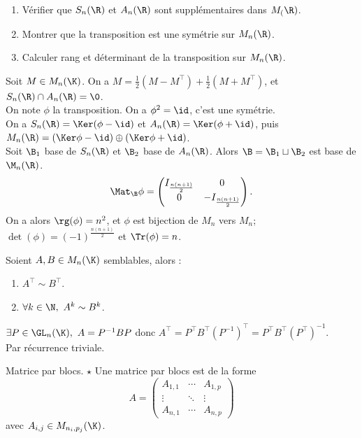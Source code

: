 \documentclass[11pt]{article}
\begin{document}
\begin{ex}{}{}
    \begin{enumerate}
        \item Vérifier que $S_n(\R)$ et $A_n(\R)$ sont supplémentaires dans $M_(\R)$.
        \item Montrer que la transposition est une symétrie sur $M_n(\R)$.
        \item Calculer rang et déterminant de la transposition sur $M_n(\R)$.
    \end{enumerate}
    \tcblower
     Soit $M\in M_n(\K)$. On a $M=\frac{1}{2}(M-M^\top) + \frac{1}{2}(M+M^\top)$, et $S_n(\R)\cap A_n(\R)=\0$.\\
     On note $\phi$ la transposition. On a $\phi^2=\id$, c'est une symétrie.\\
    On a $S_n(\R)=\Ker(\phi-\id)$ et $A_n(\R)=\Ker(\phi+\id)$, puis $M_n(\R)=(\Ker \phi - \id) \oplus (\Ker \phi + \id)$.\\
     Soit $\B_1$ base de $S_n(\R)$ et $\B_2$ base de $A_n(\R)$. Alors $\B=\B_1\sqcup\B_2$ est base de $\M_n(\R)$.
    \begin{equation*}
        \Mat_{\B}\phi=\begin{pmatrix} I_{\frac{n(n+1)}{2}} & 0 \\ 0 & -I_{\frac{n(n+1)}{2}}\end{pmatrix}.
    \end{equation*}
    On a alors $\rg(\phi)=n^2$, et $\phi$ est bijection de $M_n$ vers $M_n$; $\det(\phi)=(-1)^{\frac{n(n+1)}{2}}$ et $\Tr(\phi)=n$.
\end{ex}

\vspace*{-0.7cm}

\begin{prop}{}{}
    Soient $A,B\in M_n(\K)$ semblables, alors :
    \begin{enumerate}
        \item $A^\top\sim B^\top$.
        \item $\forall k \in \N, ~ A^k \sim B^k$.
    \end{enumerate} 
    \tcblower
     $\exists P \in \GL_n(\K), ~ A=P^{-1}BP$ donc $A^\top=P^\top B^\top(P^{-1})^\top=P^\top B^\top(P^\top)^{-1}$.\\
     Par récurrence triviale.
\end{prop}

\begin{defi}{Matrice par blocs. $\star$}{}
    Une matrice par blocs est de la forme
    \begin{equation*}
        A=\begin{pmatrix}
            A_{1,1} & \cdots & A_{1,p}\\
            \vdots & \ddots & \vdots\\
            A_{n,1} & \cdots & A_{n,p}
        \end{pmatrix}
    \end{equation*}
    avec $A_{i,j}\in M_{n_i,p_j}(\K)$.
\end{defi}
\end{document}
